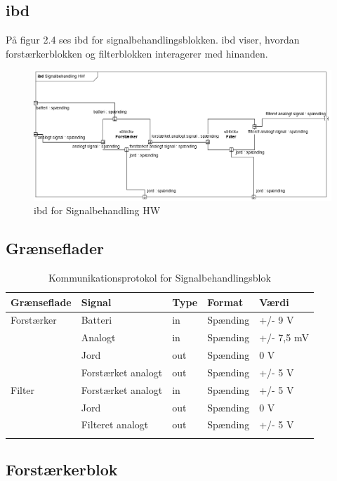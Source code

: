 \subsection{ibd}
På figur 2.4 ses ibd for signalbehandlingsblokken. ibd viser, hvordan forstærkerblokken og filterblokken interagerer med hinanden. 

\begin{figure}[H]
	\centering
	\includegraphics[width=1\textwidth]{Figurer/5}
	\caption{ibd for Signalbehandling HW}
	\label{fig:ibdhw-diagram}
\end{figure}

\subsection{Grænseflader}

\begin{longtabu} to 
	\textbf{Grænseflade} & \textbf{Signal} & \textbf{Type} & \textbf{Format} & \textbf{Værdi} \\[-1ex]
	\midrule
	Forstærker & Batteri & in & Spænding & +/- 9 V \\[-1ex]
			   & Analogt & in & Spænding & +/- 7,5 mV \\[-1ex]
			   & Jord	 & out & Spænding & 0 V \\[-1ex]
			   & Forstærket analogt & out & Spænding & +/- 5 V \\[-1ex]
	Filter	   & Forstærket analogt & in & Spænding & +/- 5 V\\[-1ex]
			   & Jord	 & out & Spænding & 0 V\\[-1ex]
			   & Filteret analogt & out & Spænding & +/- 5 V\\[-1ex]
	\caption{Kommunikationsprotokol for Signalbehandlingsblok}	
\end{longtabu}


 \subsection{Forstærkerblok}
